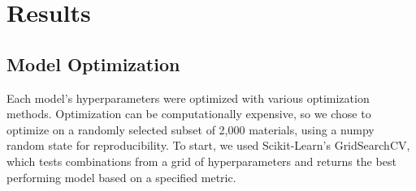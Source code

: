 \documentclass[twocolumn, nofootinbib, secnumarabic, amssymb, nobibnotes, aps, prd]{revtex4-2}
\begin{document}
\section{Results}
\subsection{Model Optimization}
Each model's hyperparameters were optimized with various optimization methods. Optimization can be computationally expensive, so we chose to optimize on a randomly selected subset of 2,000 materials, using a numpy random state for reproducibility. To start, we used Scikit-Learn's GridSearchCV, which tests combinations from a grid of hyperparameters and returns the best performing model based on a specified metric. 

\begin{table}[!h]
   \centering
\end{table}
\end{document}
